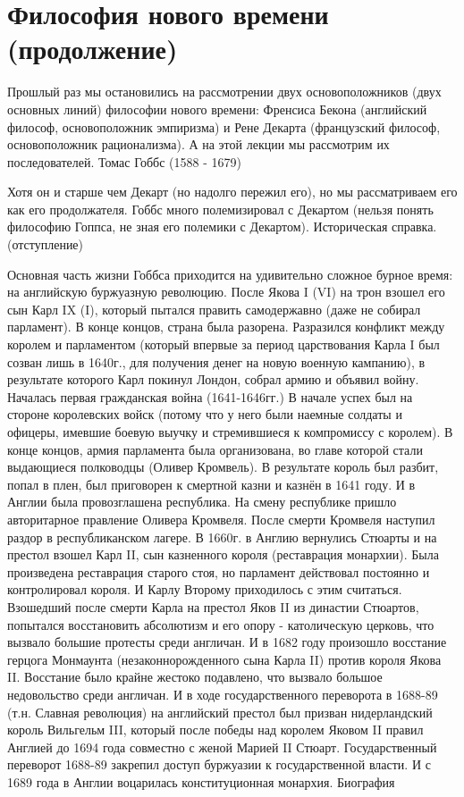 

\section{Философия нового времени (продолжение)}



Прошлый раз мы остановились на рассмотрении двух основоположников (двух основных линий) философии нового времени: Френсиса Бекона (английский философ, основоположник эмпиризма) и Рене Декарта (французский философ, основоположник рационализма). А на этой лекции мы рассмотрим их последователей.
Томас Гоббс (1588 - 1679)

Хотя он и старше чем Декарт (но надолго пережил его), но мы рассматриваем его как его продолжателя. Гоббс много полемизировал с Декартом (нельзя понять философию Гоппса, не зная его полемики с Декартом).
Историческая справка. (отступление)

Основная часть жизни Гоббса приходится на удивительно сложное бурное время: на английскую буржуазную революцию. После Якова I (VI) на трон взошел его сын Карл IX (I), который пытался править самодержавно (даже не собирал парламент). В конце концов, страна была разорена. Разразился конфликт между королем и парламентом (который впервые за период царствования Карла I был созван лишь в 1640г., для получения денег на новую военную кампанию), в результате которого Карл покинул Лондон, собрал армию и объявил войну. Началась первая гражданская война (1641-1646гг.) В начале успех был на стороне королевских войск (потому что у него были наемные солдаты и офицеры, имевшие боевую выучку и стремившиеся к компромиссу с королем). В конце концов, армия парламента была организована, во главе которой стали выдающиеся полководцы (Оливер Кромвель). В результате король был разбит, попал в плен, был приговорен к смертной казни и казнён в 1641 году. И в Англии была провозглашена республика. На смену республике пришло авторитарное правление Оливера Кромвеля. После смерти Кромвеля наступил раздор в республиканском лагере. В 1660г. в Англию вернулись Стюарты и на престол взошел Карл II, сын казненного короля (реставрация монархии). Была произведена реставрация старого стоя, но парламент действовал постоянно и контролировал короля. И Карлу Второму приходилось с этим считаться. Взошедший после смерти Карла на престол Яков II из династии Стюартов, попытался восстановить абсолютизм и его опору - католическую церковь, что вызвало большие протесты среди англичан. И в 1682 году произошло восстание герцога Монмаунта (незаконнорожденного сына Карла II) против короля Якова II. Восстание было крайне жестоко подавлено, что вызвало большое недовольство среди англичан. И в ходе государственного переворота в 1688-89 (т.н. Славная революция) на английский престол был призван нидерландский король Вильгельм III, который после победы над королем Яковом II правил Англией до 1694 года совместно с женой Марией II Стюарт. Государственный переворот 1688-89 закрепил доступ буржуазии к государственной власти. И с 1689 года в Англии воцарилась конституционная монархия.
Биография

